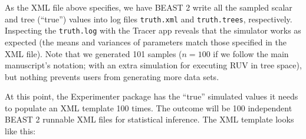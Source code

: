 \documentclass[oneside]{article}
\begin{document}
As the XML file above specifies, we have BEAST 2 write all the sampled scalar and tree (``true'') values into log files \texttt{truth.xml} and \texttt{truth.trees}, respectively.
Inspecting the \texttt{truth.log} with the Tracer app reveals that the simulator works as expected (the means and variances of parameters match those specified in the XML file).
Note that we generated 101 samples ($n=100$ if we follow the main manuscript's notation; with an extra simulation for executing RUV in tree space), but nothing prevents users from generating more data sets.

At this point, the Experimenter package has the ``true'' simulated values it needs to populate an XML template 100 times.
The outcome will be 100 independent BEAST 2 runnable XML files for statistical inference.
The XML template looks like this:

\vspace{.25cm}
\end{document}
